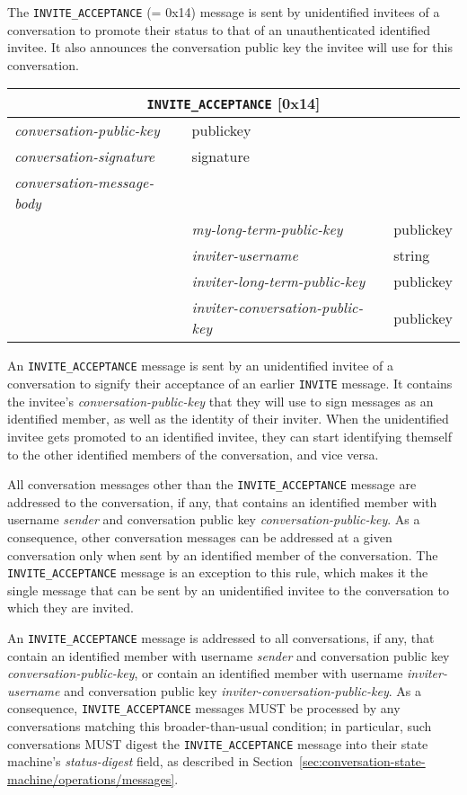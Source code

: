 \documentclass{article}
\def\npmessage#1{\texttt{#1}}
\def\field#1{\textit{#1}}
\def\smfield#1{\textsl{#1}}
\def\type#1{\textsf{#1}}
\newenvironment{conversationmessage}[2]{
\newcommand{\messagefield}[2]{
& \field{##1} & \type{##2} \\
\hline
}
\hspace{2em minus 2em}\begin{tabular}{|l|l|l|}
\hline
\multicolumn{3}{|c|}{\npmessage{#1} [#2]} \\
\hline
\hline
\field{conversation-public-key} & \multicolumn{2}{l|}{\type{publickey}} \\
\hline
\field{conversation-signature} & \multicolumn{2}{l|}{\type{signature}} \\
\hline
\field{conversation-message-body} & \multicolumn{2}{l|}{} \\
\hline
}{
\end{tabular}
}
\begin{document}
The \npmessage{INVITE\_ACCEPTANCE} (= 0x14) message is sent by unidentified invitees of a conversation to promote their status to that of an unauthenticated identified invitee.
It also announces the conversation public key the invitee will use for this conversation.

\begin{conversationmessage}{INVITE\_ACCEPTANCE}{0x14}
\messagefield{my-long-term-public-key}{publickey}
\messagefield{inviter-username}{string}
\messagefield{inviter-long-term-public-key}{publickey}
\messagefield{inviter-conversation-public-key}{publickey}
\end{conversationmessage}

An \npmessage{INVITE\_ACCEPTANCE} message is sent by an unidentified invitee of a conversation to signify their acceptance of an earlier \npmessage{INVITE} message.
It contains the invitee's \field{conversation-public-key} that they will use to sign messages as an identified member, as well as the identity of their inviter.
When the unidentified invitee gets promoted to an identified invitee, they can start identifying themself to the other identified members of the conversation, and vice versa.

All conversation messages other than the \npmessage{INVITE\_ACCEPTANCE} message are addressed to the conversation, if any, that contains an identified member with username \field{sender} and conversation public key \field{conversation-public-key}.
As a consequence, other conversation messages can be addressed at a given conversation only when sent by an identified member of the conversation.
The \npmessage{INVITE\_ACCEPTANCE} message is an exception to this rule, which makes it the single message that can be sent by an unidentified invitee to the conversation to which they are invited.

An \npmessage{INVITE\_ACCEPTANCE} message is addressed to all conversations, if any, that contain an identified member with username \field{sender} and conversation public key \field{conversation-public-key}, or contain an identified member with username \field{inviter-username} and conversation public key \field{inviter-conversation-public-key}.
As a consequence, \npmessage{INVITE\_ACCEPTANCE} messages MUST be processed by any conversations matching this broader-than-usual condition; in particular, such conversations MUST digest the \npmessage{INVITE\_ACCEPTANCE} message into their state machine's \smfield{status-digest} field, as described in Section~\ref{sec:conversation-state-machine/operations/messages}.
\end{document}
